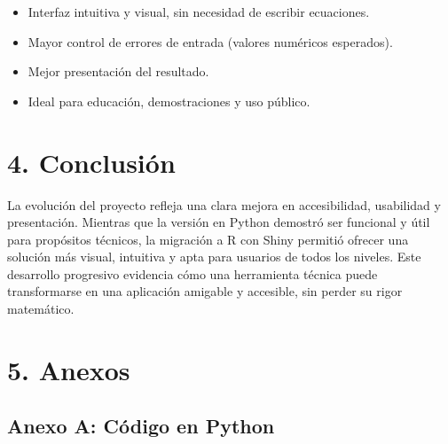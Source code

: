 \documentclass[a4paper,10pt]{article}
\begin{document}
\begin{itemize}
    \item Interfaz intuitiva y visual, sin necesidad de escribir ecuaciones.
    \item Mayor control de errores de entrada (valores numéricos esperados).
    \item Mejor presentación del resultado.
    \item Ideal para educación, demostraciones y uso público.
\end{itemize}

\section*{4. Conclusión}

La evolución del proyecto refleja una clara mejora en accesibilidad, usabilidad y presentación. Mientras que la versión en Python demostró ser funcional y útil para propósitos técnicos, la migración a R con Shiny permitió ofrecer una solución más visual, intuitiva y apta para usuarios de todos los niveles. Este desarrollo progresivo evidencia cómo una herramienta técnica puede transformarse en una aplicación amigable y accesible, sin perder su rigor matemático.

\section*{5. Anexos}

\subsection*{Anexo A: Código en Python}

\end{document}
